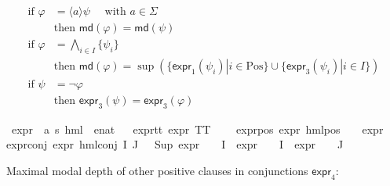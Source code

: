 \begin{isabellebody}
\begin{isamarkuptext}
\begin{align*}
    \text{if } \varphi &= \langle a \rangle \psi \quad \text{ with } a \in \Sigma \\
    & \text{then } \textsf{md}(\varphi) = \textsf{md}(\psi) \\
    \text{if } \varphi &= \bigwedge_{i \in I} \{ \psi_i \} \\
    & \text{then } \textsf{md}(\varphi) = \sup(\{\textsf{expr}_1(\psi_i) | i \in \text{Pos}\} \cup \{\textsf{expr}_3(\psi_i) | i \in I\}) \\
    \text{if } \psi &= \neg \varphi \\
    & \text{then } \textsf{expr}_3(\psi) = \textsf{expr}_3(\varphi)
\end{align*}%
\end{isamarkuptext}\isamarkuptrue%
\isamarkupfalse%
\ expr{\isacharunderscore}{\kern0pt}{}\ {\isacharcolon}{\kern0pt}{\isacharcolon}{\kern0pt}\ {\isachardoublequoteopen}{\isacharparenleft}{\kern0pt}{\isacharprime}{\kern0pt}a{\isacharcomma}{\kern0pt}\ {\isacharprime}{\kern0pt}s{\isacharparenright}{\kern0pt}\ hml\ {\isasymRightarrow}\ enat{\isachardoublequoteclose}\isanewline
\ \ \isanewline
expr{\isacharunderscore}{\kern0pt}{}{\isacharunderscore}{\kern0pt}tt{\isacharcolon}{\kern0pt}\ {\isacartoucheopen}expr{\isacharunderscore}{\kern0pt}{}\ TT\ {\isacharequal}{\kern0pt}\ {}{\isacartoucheclose}\ {\isacharbar}{\kern0pt}\isanewline
\ expr{\isacharunderscore}{\kern0pt}{}{\isacharunderscore}{\kern0pt}pos{\isacharcolon}{\kern0pt}\ {\isacartoucheopen}expr{\isacharunderscore}{\kern0pt}{}\ {\isacharparenleft}{\kern0pt}hml{\isacharunderscore}{\kern0pt}pos\ {\isasymalpha}\ {\isasymphi}{\isacharparenright}{\kern0pt}\ {\isacharequal}{\kern0pt}\ expr{\isacharunderscore}{\kern0pt}{}\ {\isasymphi}{\isacartoucheclose}\ {\isacharbar}{\kern0pt}\ \isanewline
expr{\isacharunderscore}{\kern0pt}{}{\isacharunderscore}{\kern0pt}conj{\isacharcolon}{\kern0pt}\ {\isacartoucheopen}expr{\isacharunderscore}{\kern0pt}{}\ {\isacharparenleft}{\kern0pt}hml{\isacharunderscore}{\kern0pt}conj\ I\ J\ {\isasymPhi}{\isacharparenright}{\kern0pt}\ {\isacharequal}{\kern0pt}\ {\isacharparenleft}{\kern0pt}Sup\ {\isacharparenleft}{\kern0pt}{\isacharparenleft}{\kern0pt}expr{\isacharunderscore}{\kern0pt}{}\ {\isasymcirc}\ {\isasymPhi}{\isacharparenright}{\kern0pt}\ {\isacharbackquote}{\kern0pt}\ I\ {\isasymunion}\ {\isacharparenleft}{\kern0pt}expr{\isacharunderscore}{\kern0pt}{}\ {\isasymcirc}\ {\isasymPhi}{\isacharparenright}{\kern0pt}\ {\isacharbackquote}{\kern0pt}\ I\ {\isasymunion}\ {\isacharparenleft}{\kern0pt}expr{\isacharunderscore}{\kern0pt}{}\ {\isasymcirc}\ {\isasymPhi}{\isacharparenright}{\kern0pt}\ {\isacharbackquote}{\kern0pt}\ J{\isacharparenright}{\kern0pt}{\isacharparenright}{\kern0pt}{\isacartoucheclose}%
\begin{isamarkuptext}%
Maximal modal depth of other positive clauses in conjunctions $\textsf{expr}_4$:


\end{isamarkuptext}
\end{isabellebody}
